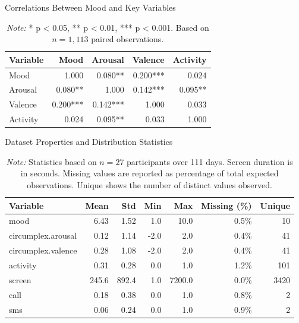 \documentclass[11pt,a4paper]{article}
\begin{document}
\begin{table}[htbp]
\centering
\caption{Correlations Between Mood and Key Variables}
\label{tab:correlations}
\begin{tabular}{lrrrr}
\toprule
\textbf{Variable} & \textbf{Mood} & \textbf{Arousal} & \textbf{Valence} & \textbf{Activity} \\
\midrule
Mood & 1.000 & 0.080** & 0.200*** & 0.024 \\
Arousal & 0.080** & 1.000 & 0.142*** & 0.095** \\
Valence & 0.200*** & 0.142*** & 1.000 & 0.033 \\
Activity & 0.024 & 0.095** & 0.033 & 1.000 \\
\bottomrule
\end{tabular}
\caption*{\textit{Note:} * p < 0.05, ** p < 0.01, *** p < 0.001. Based on ${n=1,113}$ paired observations.}
\end{table}

\begin{table}[htbp]
\centering
\caption{Dataset Properties and Distribution Statistics}
\label{tab:dataset-properties}
\begin{tabular}{lrrrrrr}
\toprule
\textbf{Variable} & \textbf{Mean} & \textbf{Std} & \textbf{Min} & \textbf{Max} & \textbf{Missing (\%)} & \textbf{Unique} \\
\midrule
mood & 6.43 & 1.52 & 1.0 & 10.0 & 0.5\% & 10 \\
circumplex.arousal & 0.12 & 1.14 & -2.0 & 2.0 & 0.4\% & 41 \\
circumplex.valence & 0.28 & 1.08 & -2.0 & 2.0 & 0.4\% & 41 \\
activity & 0.31 & 0.28 & 0.0 & 1.0 & 1.2\% & 101 \\
screen & 245.6 & 892.4 & 1.0 & 7200.0 & 0.0\% & 3420 \\
call & 0.18 & 0.38 & 0.0 & 1.0 & 0.8\% & 2 \\
sms & 0.06 & 0.24 & 0.0 & 1.0 & 0.9\% & 2 \\
\bottomrule
\end{tabular}
\caption*{\textit{Note:} Statistics based on ${n=27}$ participants over 111 days. Screen duration is in seconds. Missing values are reported as percentage of total expected observations. Unique shows the number of distinct values observed.}
\end{table}
\end{document}
